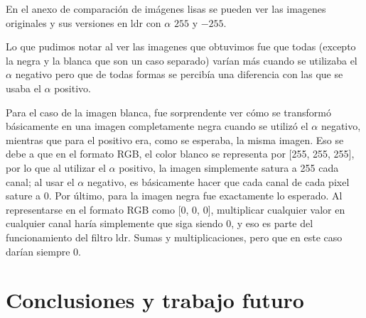\documentclass[a4paper]{article}
\begin{document}
En el anexo de comparación de imágenes lisas se pueden ver las imagenes originales y sus versiones en ldr con $\alpha$ $255$ y $-255$.

Lo que pudimos notar al ver las imagenes que obtuvimos fue que todas (excepto la negra y la blanca que son un caso separado) varían más
cuando se utilizaba el $\alpha$ negativo pero que de todas formas se percibía una diferencia con las que se usaba el $\alpha$ positivo.

Para el caso de la imagen blanca, fue sorprendente ver cómo se transformó básicamente en una imagen completamente negra cuando se utilizó el $\alpha$
negativo, mientras que para el positivo era, como se esperaba, la misma imagen. Eso se debe a que en el formato RGB, el color blanco se representa por
[255, 255, 255], por lo que al utilizar el $\alpha$ positivo, la imagen simplemente satura a 255 cada canal; al usar el $\alpha$ negativo, es básicamente
hacer que cada canal de cada pixel sature a 0.
Por último, para la imagen negra fue exactamente lo esperado. Al representarse en el formato RGB como [0, 0, 0], multiplicar cualquier valor en cualquier canal
haría simplemente que siga siendo 0, y eso es parte del funcionamiento del filtro ldr. Sumas y multiplicaciones, pero que en este caso darían siempre 0.



\section{Conclusiones y trabajo futuro}
\end{document}
